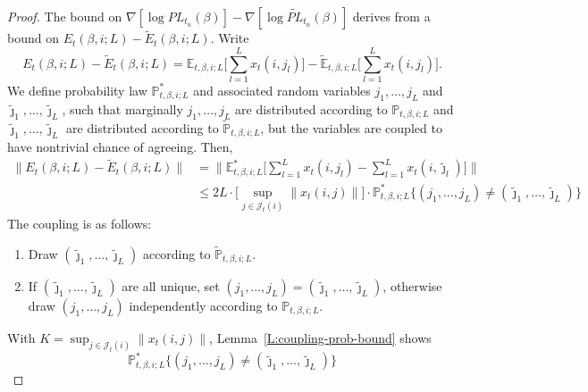 \documentclass[final]{statsoc}
\begin{document}
\begin{proof}
The bound on
\(
    \nabla [\log \mathit{PL}_{t_n}(\beta) ]
    -
    \nabla [\log \widetilde{\mathit{PL}}_{t_n}(\beta) ]
\)
derives from a bound on
\(
    E_t(\beta,i;L)
    -
    \widetilde E_t(\beta,i;L).
\)
Write
\[
    E_{t}(\beta, i; L) - \widetilde{E}_t(\beta, i; L)
        =
        \mathbb{E}_{t,\beta,i;L}
            \Big[ \sum_{l=1}^L x_t(i,j_l) \Big]
        -
        \widetilde{\mathbb{E}}_{t,\beta,i;L}
            \Big[ \sum_{l=1}^L x_t(i,j_l) \Big].
\]
We define probability law $\mathbb{P}^\ast_{t,\beta,i;L}$ and
associated random variables $j_1, \ldots, j_L$ and
$\tilde \jmath_1, \ldots, \tilde \jmath_L$, such that marginally
$j_1, \ldots, j_L$ are distributed according to $\mathbb{P}_{t,\beta,i;L}$
and $\tilde \jmath_1, \ldots, \tilde \jmath_L$ are distributed according
to $\tilde{\mathbb{P}}_{t,\beta,i;L}$, but the variables are coupled to have
nontrivial chance of agreeing.  Then,
\begin{align*}
    \Big\| E_{t}(\beta, i; L) - \widetilde{E}_t(\beta, i; L) \Big\|
        &=
            \Big\|
            \mathbb{E}_{t,\beta,i;L}^\ast
            \Big[
                \sum_{l=1}^L x_t(i,j_l)
                -
                \sum_{l=1}^L x_t(i, \tilde \jmath_l)
            \Big]
            \Big\| \\
        &\leq
            2 L
            \cdot
            \Big[
                \sup_{j \in \mathcal{J}_t(i)}
                \| x_t(i,j) \|
            \Big]
            \cdot
            \mathbb{P}^\ast_{t,\beta,i;L}
            \Big\{
                (j_1, \ldots, j_L)
                    \neq
                    (\tilde \jmath_1, \ldots, \tilde \jmath_L)
            \Big\}
\end{align*}
The coupling is as follows:
\begin{enumerate}
    \item Draw $(\tilde \jmath_1, \ldots, \tilde \jmath_L)$ according to
        $\tilde{\mathbb{P}}_{t,\beta,i;L}$.
    \item If $(\tilde \jmath_1, \ldots, \tilde \jmath_L)$ are all unique,
        set $(j_1, \ldots, j_L) = (\tilde \jmath_1, \ldots, \tilde \jmath_L)$,
        otherwise draw $(j_1, \ldots, j_L)$ independently according to
        $\mathbb{P}_{t,\beta,i;L}$.
\end{enumerate}
With $K = \sup_{j \in \mathcal{J}_t(i)} \| x_t(i,j) \|$,
Lemma~\ref{L:coupling-prob-bound} shows
\[
    \mathbb{P}^\ast_{t,\beta,i;L}
    \Big\{
        (j_1, \ldots, j_L)
            \neq
            (\tilde \jmath_1, \ldots, \tilde \jmath_L)
    \Big\}
\]
\end{proof}
\end{document}
